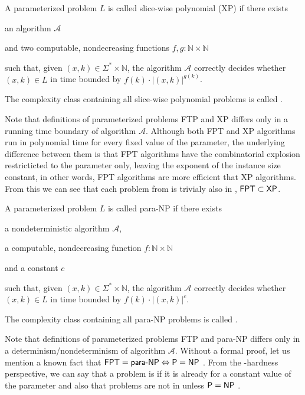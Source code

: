 \begin{definition}[XP]
    A parameterized problem $L$ is called slice-wise polynomial (XP) if there exists
    \begin{description}
        \item an algorithm $\mathcal{A}$
        \item and two computable, nondecreasing functions $f,g : \mathbb{N} \times \mathbb{N}$
    \end{description}
    such that, given $(x,k) \in \Sigma^* \times \mathbb{N}$,
    the algorithm $\mathcal{A}$ correctly decides whether $(x, k) \in L$ in time bounded by
    $f(k) \cdot |(x,k)|^{g(k)}$.
\end{definition}
The complexity class containing all slice-wise polynomial problems is called \XP.

Note that definitions of parameterized problems FTP and XP differs only in a running time boundary of algorithm $\mathcal{A}$.
Although both FPT and XP algorithms run in polynomial time for every fixed value of the parameter,
the underlying difference between them is that FPT algorithms have the combinatorial explosion
restricticted to the parameter only, leaving the exponent of the instance size constant, in other words,
FPT algorithms are more efficient that XP algorithms.
From this we can see that each problem from \FPT is trivialy also in \XP, $\textsf{FPT} \subset \textsf{XP}$.

\begin{definition}[para-NP]
    A parameterized problem $L$ is called para-NP if there exists
    \begin{description}
        \item a nondeterministic algorithm $\mathcal{A}$,
        \item a computable, nondecreasing function $f : \mathbb{N} \times \mathbb{N}$
        \item and a constant $c$
    \end{description}
    such that, given $(x,k) \in \Sigma^* \times \mathbb{N}$,
    the algorithm $\mathcal{A}$ correctly decides whether $(x, k) \in L$ in time bounded by
    $f(k) \cdot |(x,k)|^c$.
\end{definition}
The complexity class containing all para-NP problems is called \pNP.

Note that definitions of parameterized problems FTP and para-NP differs only in a determinism/nondeterminism of
algorithm $\mathcal{A}$.
Without a formal proof, let us mention a known fact that $\textsf{FPT} = \textsf{para-NP} \Leftrightarrow \textsf{P} = \textsf{NP}$ \cite[p.~39]{Flum2006}.
From the \pNP-hardness perspective, we can say that a problem is \pNPh if it is \NPh already for a constant value of the parameter
and also that \pNPh problems are not in \XP unless $\textsf{P} = \textsf{NP}$ \cite[p.~41]{Flum2006}. 


